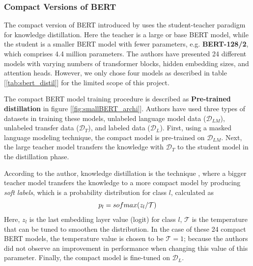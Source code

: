 \documentclass[11pt]{article}
\begin{document}
\subsubsection{Compact Versions of BERT}
The compact version of BERT introduced by \cite{smallBERT} uses the student-teacher paradigm for knowledge distillation. Here the teacher is a large or base BERT model, while the student is a smaller BERT model with fewer parameters, e.g. \textbf{\small BERT-128/2}, which comprises 4.4 million parameters. The authors have presented 24 different models with varying numbers of transformer blocks, hidden embedding sizes, and attention heads. However, we only chose four models as described in table [\ref{tab:sbert_distil}] for the limited scope of this project.

The compact BERT model training procedure is described as \textbf{Pre-trained distillation} in figure [\ref{fig:smallBERT_archi}]. Authors have used three types of datasets in training these models, unlabeled language model data ($\mathcal{D}_{LM}$), unlabeled transfer data ($\mathcal{D}_{T}$), and labeled data ($\mathcal{D}_{L}$). First, using a masked language modeling technique, the compact model is pre-trained on $\mathcal{D}_{LM}$. Next, the large teacher model transfers the knowledge with $\mathcal{D}_{T}$ to the student model in the distillation phase.

According to the author, knowledge distillation is the technique \cite{kdistillation},  where a bigger teacher model transfers the knowledge to a more compact model by producing \textit{soft labels}, which is a probability distribution for class $l$, calculated 
as 
\begin{equation}
\label{eq:softmax-temp}
\small
    p_l=sofmax(z_l/\mathcal{T})
\end{equation}
 Here, $z_l$ is the last embedding layer value (logit) for class $l$, $\mathcal{T}$ is the temperature that can be tuned to smoothen the distribution. In the case of these 24 compact BERT models, the temperature value is chosen to be $\mathcal{T}=1$; because the authors \cite{smallBERT} did not observe an improvement in performance when changing this value of this parameter.
Finally, the compact model is fine-tuned on $\mathcal{D}_{L}$.
\end{document}

